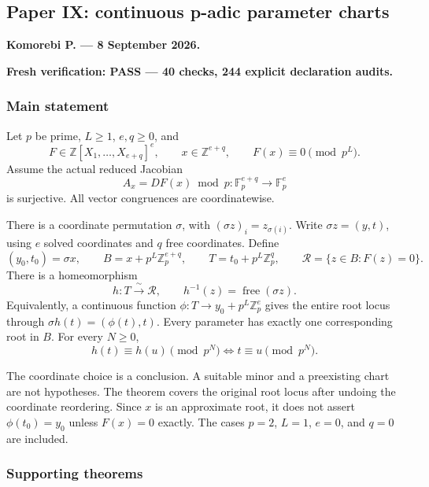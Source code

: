 \hypertarget{cont5:paper-ix-continuous-p-adic-parameter-charts}{%
\subsection{Paper IX: continuous p-adic parameter
charts}\label{cont5:paper-ix-continuous-p-adic-parameter-charts}}

\textbf{Komorebi P. --- 8 September 2026.}

\textbf{Fresh verification: PASS --- 40 checks, 244 explicit declaration
audits.}

\hypertarget{cont5:main-statement}{%
\subsubsection{Main statement}\label{cont5:main-statement}}

Let \(p\) be prime, \(L\ge1\), \(e,q\ge0\), and \[
F\in\mathbb Z[X_1,\ldots,X_{e+q}]^e,\qquad
x\in\mathbb Z^{e+q},\qquad F(x)\equiv0\pmod{p^L}.
\] Assume the actual reduced Jacobian \[
A_x=DF(x)\bmod p:\mathbb F_p^{e+q}\longrightarrow\mathbb F_p^e
\] is surjective. All vector congruences are coordinatewise.

There is a coordinate permutation \(\sigma\), with
\((\sigma z)_i=z_{\sigma(i)}\). Write \(\sigma z=(y,t)\), using \(e\)
solved coordinates and \(q\) free coordinates. Define \[
(y_0,t_0)=\sigma x,\qquad
B=x+p^L\mathbb Z_p^{e+q},\qquad
T=t_0+p^L\mathbb Z_p^q,\qquad
\mathcal R=\{z\in B:F(z)=0\}.
\] There is a homeomorphism \[
h:T\xrightarrow{\ \sim\ }\mathcal R,\qquad
h^{-1}(z)=\operatorname{free}(\sigma z).
\] Equivalently, a continuous function
\(\phi:T\to y_0+p^L\mathbb Z_p^e\) gives the entire root locus through
\(\sigma h(t)=(\phi(t),t)\). Every parameter has exactly one
corresponding root in \(B\). For every \(N\ge0\), \[
\boxed{h(t)\equiv h(u)\pmod{p^N}\iff t\equiv u\pmod{p^N}.}
\]

The coordinate choice is a conclusion. A suitable minor and a
preexisting chart are not hypotheses. The theorem covers the original
root locus after undoing the coordinate reordering. Since \(x\) is an
approximate root, it does not assert \(\phi(t_0)=y_0\) unless \(F(x)=0\)
exactly. The cases \(p=2\), \(L=1\), \(e=0\), and \(q=0\) are included.

\hypertarget{cont5:supporting-theorems}{%
\subsubsection{Supporting theorems}\label{cont5:supporting-theorems}}

